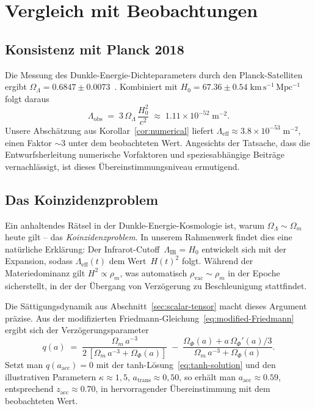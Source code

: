 \documentclass[12pt,a4paper]{article}
\theoremstyle{definition}
\theoremstyle{plain}
\theoremstyle{remark}
\newcommand{\Leff}{\Lambda_{\mathrm{eff}}}
\newcommand{\LIR}{\Lambda_{\mathrm{IR}}}
\begin{document}
\section{Vergleich mit Beobachtungen}\label{sec:observations}

\subsection{Konsistenz mit Planck 2018}

Die Messung des Dunkle-Energie-Dichteparameters durch den
Planck-Satelliten ergibt
$\Omega_{\Lambda} = 0.6847 \pm 0.0073$~\cite{Planck2018}.
Kombiniert mit $H_0 = 67.36 \pm 0.54\;\mathrm{km\,s^{-1}\,Mpc^{-1}}$
folgt daraus
\begin{equation}
  \Lambda_{\mathrm{obs}} \;=\; 3\,\Omega_{\Lambda}\,
  \frac{H_0^{2}}{c^{2}}
  \;\approx\; 1.11 \times 10^{-52}\;\mathrm{m}^{-2}.
\end{equation}
Unsere Absch\"atzung aus Korollar~\ref{cor:numerical} liefert
$\Leff \approx 3.8 \times 10^{-53}\;\mathrm{m}^{-2}$, einen Faktor
$\sim 3$ unter dem beobachteten Wert. Angesichts der Tatsache, dass die
Entwurfsherleitung numerische Vorfaktoren und speziesabh\"angige
Beitr\"age vernachl\"assigt, ist dieses \"Ubereinstimmungsniveau
ermutigend.

\subsection{Das Koinzidenzproblem}

Ein anhaltendes R\"atsel in der Dunkle-Energie-Kosmologie ist, warum
$\Omega_{\Lambda} \sim \Omega_{m}$ heute gilt -- das
\emph{Koinzidenzproblem}. In unserem Rahmenwerk findet dies eine
nat\"urliche Erkl\"arung: Der Infrarot-Cutoff~$\LIR = H_0$ entwickelt
sich mit der Expansion, sodass $\Leff(t)$ dem Wert~$H(t)^{2}$ folgt.
W\"ahrend der Materiedominanz gilt $H^{2} \propto \rho_{m}$, was
automatisch $\rho_{\mathrm{vac}} \sim \rho_{m}$ in der Epoche
sicherstellt, in der der \"Ubergang von Verz\"ogerung zu Beschleunigung
stattfindet.

Die S\"attigungsdynamik aus Abschnitt~\ref{sec:scalar-tensor} macht
dieses Argument pr\"azise. Aus der modifizierten
Friedmann-Gleichung~\eqref{eq:modified-Friedmann} ergibt sich der
Verz\"ogerungsparameter
\begin{equation}
  q(a) \;=\; \frac{\Omega_{m}\,a^{-3}}{2\,[\Omega_{m}\,a^{-3}
  + \Omega_{\Phi}(a)]}
  \;-\; \frac{\Omega_{\Phi}(a) + a\,\Omega_{\Phi}'(a)/3}
       {\Omega_{m}\,a^{-3} + \Omega_{\Phi}(a)}.
\end{equation}
Setzt man $q(a_{\mathrm{acc}}) = 0$ mit der
tanh-L\"osung~\eqref{eq:tanh-solution} und den illustrativen Parametern
$\kappa \approx 1{,}5$, $a_{\mathrm{trans}} \approx 0{,}50$, so erh\"alt man
$a_{\mathrm{acc}} \approx 0.59$, entsprechend
$z_{\mathrm{acc}} \approx 0.70$, in hervorragender \"Ubereinstimmung
mit dem beobachteten Wert.
\end{document}

